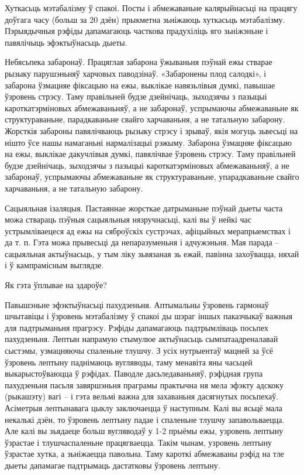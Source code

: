 Хуткасьць мэтабалізму ў спакоі.
Посты і абмежаваньне калярыйнасьці на працягу доўгага часу (больш за 20 дзён) прыкметна зьніжаюць хуткасьць мэтабалізму. Пэрыядычныя рэфіды дапамагаюць часткова прадухіліць яго зьніжэньне і павялічыць эфэктыўнасьць дыеты.

Небясьпека забаронаў. 
Працяглая забарона ўжываньня пэўнай ежы стварае рызыку парушэньняў харчовых паводзінаў. «Забаронены плод салодкі», і забарона ўзмацняе фіксацыю на ежы, выклікае навязьлівыя думкі, павышае ўзровень стрэсу. Таму правільней будзе дзейнічаць, зыходзячы з пазыцыі кароткатэрміновых абмежаваньняў, а не забаронаў, успрымаючы абмежаваньне як структураваньне, парадкаваньне свайго харчаваньня, а не татальную забарону. Жорсткія забароны павялічваюць рызыку стрэсу і зрываў, якія могуць зьвесьці на нішто ўсе нашы намаганьні нармалізацыі рэжыму.
Забарона ўзмацняе фіксацыю на ежы, выклікае дакучлівыя думкі, павялічвае ўзровень стрэсу. Таму правільней будзе дзейнічаць, зыходзячы з пазыцыі кароткатэрміновых абмежаваньняў, а не забаронаў, успрымаючы абмежаваньне як структураваньне, упарадкаваньне свайго харчаваньня, а не татальную забарону.

Сацыяльная ізаляцыя.
Пастаяннае жорсткае датрыманьне пэўнай дыеты часта можа ствараць пэўныя сацыяльныя нязручнасьці, калі вы ў нейкі час устрымліваецеся ад ежы на сяброўскіх сустрэчах, афіцыйных мерапрыемствах і да т. п. Гэта можа прывесьці да непаразуменьня і адчужэньня. Мая парада – сацыяльная актыўнасьць, у тым ліку зьвязаная зь ежай, павінна захоўвацца, няхай і ў кампрамісным выглядзе.

Як гэта ўплывае на здароўе?

Павышэньне эфэктыўнасьці пахудзеньня.
Аптымальны ўзровень гармонаў шчытавіцы і ўзровень мэтабалізму ў спакоі ды шэраг іншых паказчыкаў важныя для падтрыманьня прагрэсу. Рэфіды дапамагаюць падтрымліваць посьпех пахудзеньня. Лептын напрамую стымулюе актыўнасьць сымпатаадреналавай сыстэмы, узмацняючы спаленьне тлушчу. З усіх нутрыентаў мацней за ўсё ўзровень лептыну паднімаюць вугляводы, таму менавіта яны часьцей выкарыстоўваюцца ў рэфідах. Паводле дасьледаваньняў, рэфідная група пахудзеньня пасьля завяршэньня праграмы практычна ня мела эфэкту адскоку (рыкашэту) вагі – і гэта вельмі важна для захаваньня дасягнутых посьпехаў.
Асіметрыя лептынавага цыклу заключаецца ў наступным. Калі вы ясьцё мала некалькі дзён, то ўзровень лептыну падае і спаленьне тлушчу запавольваецца. Але калі вы зьядаеце больш вугляводаў у 1-2 прыёмы ежы, узровень лептыну ўзрастае і тлушчаспаленьне працягваецца. Такім чынам, узровень лептыну ўзрастае хутка, а зьніжаецца павольна. Таму кароткі абмежаваны рэфід на тле дыеты дапамагае падтрымаць дастатковы ўзровень лептыну.

